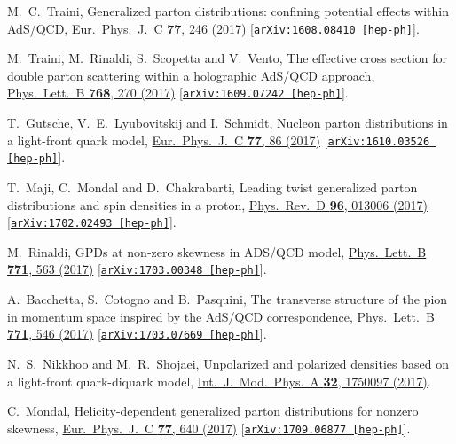 \documentclass[aps,prl,reprint,groupedaddress, preprintnumbers]{revtex4-1}
\begin{document}
\begin{thebibliography}{50}
  M.~C.~Traini,
  Generalized parton distributions: confining potential effects within AdS/QCD,
  \href{https://doi.org/10.1140/epjc/s10052-017-4775-z}{Eur.\ Phys.\ J.\ C {\bf 77},  246 (2017)}
  [\href{https://arxiv.org/abs/1608.08410}{\tt arXiv:1608.08410 [hep-ph]}].


  M.~Traini, M.~Rinaldi, S.~Scopetta and V.~Vento,
  The effective cross section for double parton scattering within a holographic AdS/QCD approach,
  \href{https://doi.org/10.1016/j.physletb.2017.02.061}{Phys.\ Lett.\ B {\bf 768}, 270 (2017)}
  [\href{https://arxiv.org/abs/1609.07242}{\tt arXiv:1609.07242 [hep-ph]}].


  T.~Gutsche, V.~E.~Lyubovitskij and I.~Schmidt,
  Nucleon parton distributions in a light-front quark model,
  \href{https://doi.org/10.1140/epjc/s10052-017-4648-5}{Eur.\ Phys.\ J.\ C {\bf 77},  86 (2017)}
  [\href{https://arxiv.org/abs/1610.03526}{\tt arXiv:1610.03526 [hep-ph]}].


  T.~Maji, C.~Mondal and D.~Chakrabarti,
  Leading twist generalized parton distributions and spin densities in a proton,
  \href{https://doi.org/10.1103/PhysRevD.96.013006}{Phys.\ Rev.\ D {\bf 96},  013006 (2017)}
  [\href{https://arxiv.org/abs/1702.02493}{\tt arXiv:1702.02493 [hep-ph]}].


  M.~Rinaldi,
  GPDs at non-zero skewness in ADS/QCD model,
  \href{https://doi.org/10.1016/j.physletb.2017.06.010}{Phys.\ Lett.\ B {\bf 771}, 563 (2017)}
  [\href{https://arxiv.org/abs/1703.00348}{\tt arXiv:1703.00348 [hep-ph]}].


  A.~Bacchetta, S.~Cotogno and B.~Pasquini,
  The transverse structure of the pion in momentum space inspired by the AdS/QCD correspondence,
  \href{https://doi.org/10.1016/j.physletb.2017.05.072}{Phys.\ Lett.\ B {\bf 771}, 546 (2017)}
  [\href{https://arxiv.org/abs/1703.07669}{\tt arXiv:1703.07669 [hep-ph]}].


  N.~S.~Nikkhoo and M.~R.~Shojaei,
  Unpolarized and polarized densities based on a light-front quark-diquark model,
  \href{https://doi.org/10.1142/S0217751X1750097X}{Int.\ J.\ Mod.\ Phys.\ A {\bf 32},  1750097 (2017)}.
  
  
  C.~Mondal,
  Helicity-dependent generalized parton distributions for nonzero skewness,
  \href{https://doi.org/10.1140/epjc/s10052-017-5203-0}{Eur.\ Phys.\ J.\ C {\bf 77},  640 (2017)}
  [\href{https://arxiv.org/abs/1709.06877}{\tt arXiv:1709.06877 [hep-ph]}].
  

\end{thebibliography}
\end{document}
